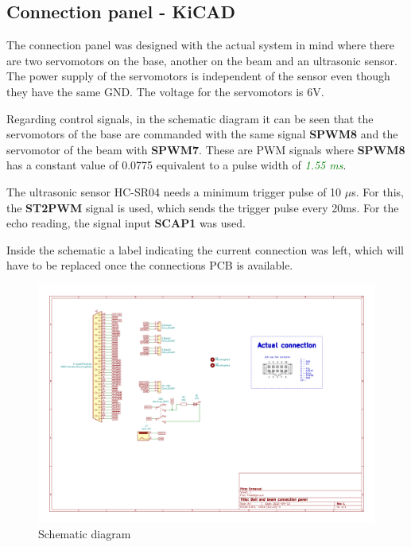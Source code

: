 \subsection{Connection panel - KiCAD}
The connection panel was designed with the actual system in mind where there are two servomotors on the base, another on the beam and an ultrasonic sensor.
The power supply of the servomotors is independent of the sensor even though they have the same GND. The voltage for the servomotors is 6V.\par
Regarding control signals, in the schematic diagram it can be seen that the servomotors of the base are commanded with the same signal \textbf{SPWM8} and the servomotor of the beam with \textbf{SPWM7}. These are PWM signals where \textbf{SPWM8} has a constant value of 0.0775 equivalent to a pulse width of \textcolor{green}{\textit{1.55 ms}}.\par
The ultrasonic sensor HC-SR04 needs a minimum trigger pulse of 10 $\mu$s. For this, the \textbf{ST2PWM} signal is used, which sends the trigger pulse every 20ms. For the echo reading, the signal input \textbf{SCAP1} was used.\par
Inside the schematic a label indicating the current connection was left, which will have to be replaced once the connections PCB is available.
    \begin{figure}[H]
        \centering
        \includegraphics[width=\textwidth]{Images/Ball and Bean/Hardware/Ball and beam connection panel.pdf}
        \caption{Schematic diagram}
        \label{fig42}
    \end{figure}

